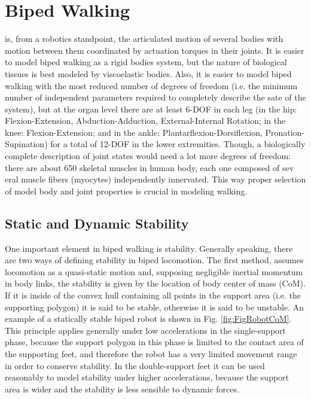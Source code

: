 \section{Biped Walking}
 is, from a robotics standpoint, the
articulated motion of several bodies with motion between them
coordinated by actuation torques in their joints. It is easier to
model biped walking as a rigid bodies system, but the nature of
biological tissues is best modeled by viscoelastic bodies. Also, it is
easier to model biped walking with the most reduced number of degrees
of freedom (i.e. the minimum number of independent parameters required
to completely describe the sate of the system), but at the organ level
there are at least 6-DOF in each leg (in the hip: Flexion-Extension,
Abduction-Adduction, External-Internal Rotation; in the knee:
Flexion-Extension; and in the ankle: Plantarflexion-Dorsiflexion,
Pronation-Supination) for a total of 12-DOF in the lower
extremities. Though, a biologically complete description of joint
states would need a lot more degrees of freedom: there are about 650
skeletal muscles in human body, each one composed of sev eral muscle
fibers (myocytes) independently innervated. This way proper selection
of model body and joint properties is crucial in modeling walking.




\subsection{Static and Dynamic Stability}
One important element in biped walking is stability. Generally
speaking, there are two ways of defining stability in biped
locomotion. The first method, assumes locomotion as a quasi-static
motion and, supposing negligible inertial momentum in body links, the
stability is given by the location of body center of mass (CoM). If it
is inside of the convex hull containing all points in the support area
(i.e. the supporting polygon) it is said to be stable, otherwise it is
said to be unstable. An example of a statically stable biped robot is
shown in Fig. \ref{fig:FigRobotCoM}. This principle applies generally
under low accelerations in the single-support phase, because the
support polygon in this phase is limited to the contact area of the
supporting feet, and therefore the robot has a very limited movement
range in order to conserve stability. In the double-support feet it
can be used reasonably to model stability under higher accelerations,
because the support area is wider and the stability is less sensible
to dynamic forces.



